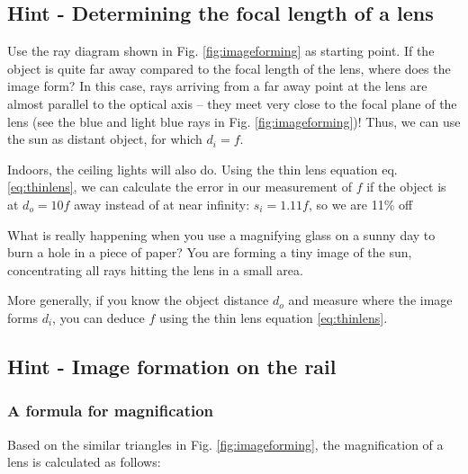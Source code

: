 \documentclass[a4paper]{report}
\begin{document}
    \clearpage
    
    
    \subsection{Hint - Determining the focal length of a lens}
	\hypertarget{hintTo-focal_length}{}
    Use the ray diagram shown in Fig. \ref{fig:imageforming} as starting point. If the object is quite far away compared to the focal length of the lens, where does the image form? In this case, rays arriving from a far away point at the lens are almost parallel to the optical axis -- they meet very close to the focal plane of the lens (see the blue and light blue rays in Fig. \ref{fig:imageforming})! Thus, we can use the sun as distant object, for which $d_i = f$. 
    
    Indoors, the ceiling lights will also do. Using the thin lens equation eq. \ref{eq:thinlens}, we can calculate the error in our measurement of $f$ if the object is at $d_o = 10f$ away instead of at near infinity: $s_i = 1.11f$, so we are 11\% off
    
    What is really happening when you use a magnifying glass on a sunny day to burn a hole in a piece of paper? You are forming a tiny image of the sun, concentrating all rays hitting the lens in a small area. 
    
    More generally, if you know the object distance $d_o$ and measure where the image forms $d_i$, you can deduce $f$ using the thin lens equation \ref{eq:thinlens}.


    \clearpage
    
    \subsection{Hint - Image formation on the rail}
	\hypertarget{hintTo-image}{}

    \subsubsection{A formula for magnification}
	Based on the similar triangles in Fig. \ref{fig:imageforming}, the magnification of a lens is calculated as follows:
	
\end{document}
